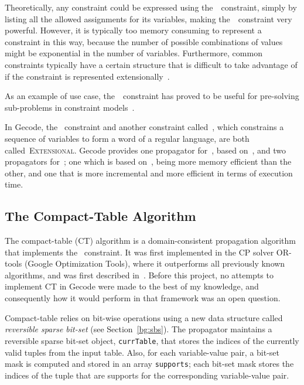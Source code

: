 \documentclass[a4paper,11pt]{article}
\theoremstyle{definition}
\newcommand{\Secref}[1]{Section~\ref{#1}}
\newcommand{\Table}{\Constraint{Table}}
\newcommand{\Regular}{\Constraint{Regular}}
\newcommand{\Extensional}{\Constraint{Extensional}~}
\def\Extensional{\textsc{Extensional}}
\newcommand{\CTpaper}[0]{DBLP:conf/cp/DemeulenaereHLP16}
\numberwithin{equation}{section}
\begin{document}
Theoretically, any constraint could be expressed using the~\Table~constraint,
simply by listing all the allowed assignments for its variables,
making the~\Table~constraint very powerful. However,
it is typically too memory consuming to represent a constraint in this way,
because the number of possible combinations of values might be exponential in the
number of variables.
Furthermore, common constraints
typically have a certain structure
that is difficult to take advantage of if the constraint is represented
extensionally~\cite{SchulteCarlsson:FDsys}.

As an example of use case, the~\Table~constraint has proved to be useful for
pre-solving sub-problems in constraint models~\cite{Dekker:MSc}.

In Gecode, the \Table~constraint and another constraint
called~, which constrains a sequence of variables
to form a word of a regular language, are both called~\Extensional.
Gecode provides one propagator for~\Regular, based on~\cite{Pesant:seqs},
and two propagators for~\Table; one which is based
on~\cite{DBLP:journals/ai/BessiereRYZ05}, being more memory efficient
than the other,
and one that is more incremental and more efficient in terms of execution time.

\subsection{The Compact-Table Algorithm}
\label{bg:ct}
The compact-table (CT) algorithm is a domain-consistent propagation algorithm
that implements the \Table~constraint. It was first implemented in the CP solver
OR-tools (Google Optimization Tools),
where it outperforms all previously
known algorithms, and was first described in~\cite{\CTpaper}.
Before this project, no attempts to implement CT in Gecode were made
to the best of my knowledge,
and consequently how it would perform in that framework
was an open question.

Compact-table relies on bit-wise operations using a new
data structure
called \emph{reversible sparse bit-set} (see \Secref{bg:sbs}).
The propagator maintains a reversible sparse bit-set object, \texttt{currTable},
that stores the indices of the currently valid tuples from the input table.
Also, for each variable-value pair, a bit-set mask is computed and stored in an
array \texttt{supports};
each bit-set mask stores the indices of the tuple that are supports for the
corresponding variable-value pair.
\end{document}
